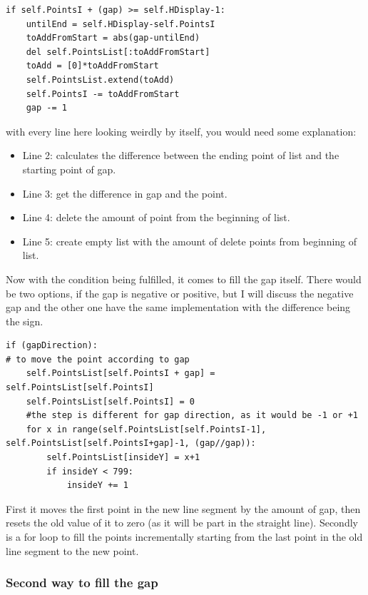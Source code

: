 \begin{listing}[H]
\begin{verbatim}
if self.PointsI + (gap) >= self.HDisplay-1:
	untilEnd = self.HDisplay-self.PointsI
	toAddFromStart = abs(gap-untilEnd)
	del self.PointsList[:toAddFromStart]
	toAdd = [0]*toAddFromStart
	self.PointsList.extend(toAdd)
	self.PointsI -= toAddFromStart
	gap -= 1
\end{verbatim}
\end{listing}

with every line here looking weirdly by itself, you would need some explanation:

\begin{itemize}
	\item Line 2: calculates the difference between the ending point of list and the starting point of gap.
	\item Line 3: get the difference in gap and the point.
	\item Line 4: delete the amount of point from the beginning of list.
	\item Line 5: create empty list with the amount of delete points from beginning of list.
\end{itemize}

Now with the condition being fulfilled, it comes to fill the gap itself. There would be two options, if the gap is negative or positive, but I will discuss the negative gap and the other one have the same implementation with the difference being the sign.

\begin{listing}[H]
	\begin{verbatim}
if (gapDirection):
# to move the point according to gap
	self.PointsList[self.PointsI + gap] = self.PointsList[self.PointsI]
	self.PointsList[self.PointsI] = 0
	#the step is different for gap direction, as it would be -1 or +1
	for x in range(self.PointsList[self.PointsI-1], self.PointsList[self.PointsI+gap]-1, (gap//gap)):
		self.PointsList[insideY] = x+1
		if insideY < 799:
			insideY += 1
	\end{verbatim}
\end{listing}

First it moves the first point in the new line segment by the amount of gap, then resets the old value of it to zero (as it will be part in the straight line). Secondly is a for loop to fill the points incrementally starting from the last point in the old line segment to the new point.

\subsubsection{ Second way to fill the gap}

